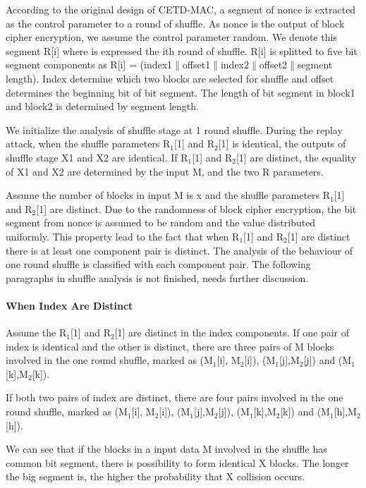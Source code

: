 \documentclass{article}
\begin{document}
According to the
original design of CETD-MAC, a segment of nonce is extracted as the control
parameter to a round of shuffle.  As nonce is the output of block cipher
encryption, we assume the control parameter random. We denote this segment R[i] where is expressed
the ith round of shuffle. R[i] is splitted to five bit segment components as R[i] =
(index1$\|$offset1$\|$index2$\|$offset2$\|$segment length). Index determine
which two blocks are selected for shuffle and offset determines the beginning
bit of bit segment. The length of bit segment in block1 and block2 is determined
by segment length. 

We initialize the analysis of shuffle stage at 1 round shuffle. During the
replay attack, when the shuffle
parameters R$_1$[1] and R$_2$[1] is identical, the outputs of shuffle stage X1
and X2 are identical. If R$_1$[1] and R$_2$[1] are distinct, the equality of X1
and X2 are determined by the input M, and the two R parameters.

Assume the number of blocks in input M is x and the shuffle parameters R$_1$[1]
and R$_2$[1] are distinct. Due to the randomness of block cipher encryption, the
bit segment from nonce is assumed to be random and the value distributed
uniformly. This property lead to the fact that when R$_1$[1]
and R$_2$[1] are distinct there is at least one component pair is distinct. The
analysis of the behaviour of one round shuffle is classified with each component
pair. 
The following paragraphs in shuffle analysis is not finished, needs further
discussion.
\paragraph{When Index Are Distinct}
Assume the R$_1$[1] and R$_2$[1] are distinct in the index components. If one
pair of index is identical and the other is distinct, there are three pairs of M
blocks involved in the one round shuffle, marked as (M$_1$[i], M$_2$[i]),
(M$_1$[j],M$_2$[j]) and (M$_1$[k],M$_2$[k]).

If both two pairs of index are distinct, there are four pairs involved in the
one round shuffle, marked as (M$_1$[i], M$_2$[i]),
(M$_1$[j],M$_2$[j]), (M$_1$[k],M$_2$[k]) and (M$_1$[h],M$_2$[h]).

We can see that if the blocks in a input data M involved in the shuffle has
common bit segment, there is possibility to form identical X blocks.
The longer the big segment is, the higher the probability that X collision
occurs.
\end{document}
